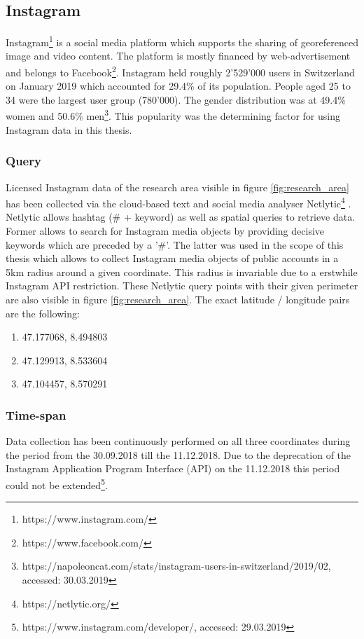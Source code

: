 \subsection{Instagram} \label{instagram}
Instagram\footnote{https://www.instagram.com/} is a social media platform which supports the sharing of georeferenced image and video content. The platform is mostly financed by web-advertisement and belongs to Facebook\footnote{https://www.facebook.com/}. Instagram held roughly 2'529'000 users in Switzerland on January 2019 which accounted for 29.4\% of its population. People aged 25 to 34 were the largest user group (780'000). The gender distribution was at 49.4\% women and 50.6\% men\footnote{https://napoleoncat.com/stats/instagram-users-in-switzerland/2019/02, accessed: 30.03.2019}. This popularity was the determining factor for using Instagram data in this thesis.\\

\subsubsection{Query} \label{netlytic}
Licensed Instagram data of the research area visible in figure \ref{fig:research_area} has been collected via the cloud-based text and social media analyser Netlytic\footnote{https://netlytic.org/} \parencite{Gruzd2016}. Netlytic allows hashtag (\# + keyword) as well as spatial queries to retrieve data. Former allows to search for Instagram media objects by providing decisive keywords which are preceded by a '\#'. The latter was used in the scope of this thesis which allows to collect Instagram media objects of public accounts in a 5km radius around a given coordinate. This radius is invariable due to a erstwhile Instagram API restriction. These Netlytic query points with their given perimeter are also visible in figure \ref{fig:research_area}. The exact latitude / longitude pairs are the following:\\
\begin{enumerate}
  \item 47.177068, 8.494803
  \item 47.129913, 8.533604
  \item 47.104457, 8.570291
\end{enumerate}

\subsubsection{Time-span} \label{Instagram_timespan}
Data collection has been continuously performed on all three coordinates during the period from the 30.09.2018 till the 11.12.2018. Due to the deprecation of the Instagram Application Program Interface (API) on the 11.12.2018 this period could not be extended\footnote{https://www.instagram.com/developer/, accessed: 29.03.2019}.

